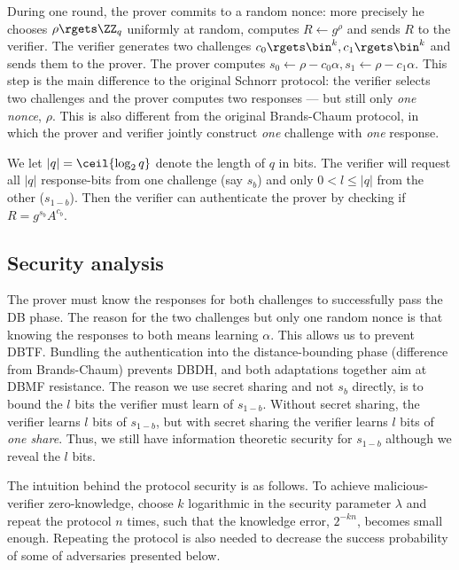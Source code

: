 During one round, the prover commits to a random nonce: more precisely he chooses \(\rho\rgets \ZZ_q\) uniformly at random, computes \(R\gets g^\rho\) and sends \(R\) to the verifier.
The verifier generates two challenges \(c_0\rgets \bin^k, c_1\rgets \bin^k\) and sends them to the prover.
The prover computes \(s_0\gets \rho - c_0\alpha, s_1\gets \rho - c_1\alpha\).
This step is the main difference to the original Schnorr protocol: the verifier selects two challenges and the prover computes two responses --- but still only \emph{one nonce}, \(\rho\).
This is also different from the original Brands-Chaum protocol, in which the 
prover and verifier jointly construct \emph{one} challenge with \emph{one} 
response.

We let \(|q| = \ceil{\log_2 q}\) denote the length of \(q\) in bits.
The verifier will request all \(|q|\) response-bits from one challenge (say 
\(s_b\)) and only \(0 < l\leq |q|\) from the other (\(s_{1-b}\)).
Then the verifier can authenticate the prover by checking if \(R = 
  g^{s_b}A^{c_b}\).

\subsection{Security analysis}

The prover must know the responses for both challenges to successfully pass the \ac{DB} phase.
The reason for the two challenges but only one random nonce is that knowing the responses to both means learning \(\alpha\).
This allows us to prevent \ac{DBTF}.
Bundling the authentication into the distance-bounding phase (difference from Brands-Chaum) prevents \ac{DBDH}, and both adaptations together aim at \ac{DBMF} resistance. %
The reason we use secret sharing and not \(s_b\) directly, is to bound the \(l\) bits the verifier must learn of \(s_{1-b}\).
Without secret sharing, the verifier learns \(l\) bits of \(s_{1-b}\), but with secret sharing the verifier learns \(l\) bits of \emph{one share}.
Thus, we still have information theoretic security for \(s_{1-b}\) although we reveal the \(l\) bits.

The intuition behind the protocol security is as follows.
To achieve malicious-verifier zero-knowledge, choose \(k\) logarithmic in the security parameter \(\lambda\) and repeat the protocol \(n\) times, such that 
the knowledge error, \(2^{-kn}\), becomes small enough.
Repeating the protocol is also needed to decrease the success probability of some of adversaries presented below.

